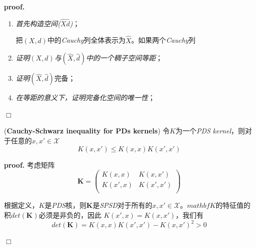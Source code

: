 \textbf{proof.}\hspace{0.5em}
\begin{enumerate}
    \item \textsl{首先构造空间($\hat{X}$$\hat{d}$)}；
    
    把$(X,d)$中的\textsl{Cauchy}列全体表示为$\hat{X}$。如果两个\textsl{Cauchy}列

    \item \textsl{证明$(X,d)$与$(\hat{X},\hat{d})$中的一个稠子空间等距}；
    \item \textsl{证明$(\hat{X},\hat{d})$}完备；
    \item \textsl{在等距的意义下，证明完备化空间的唯一性}；
\end{enumerate}
$\Box$

\begin{mdframed}
  \begin{lemma}
    (\textbf{Cauchy-Schwarz inequality for PDs kernels})\hspace{0.5em} 令$K$为一个\textsl{PDS kernel}，则对于任意的$x,x'\in \mathcal{X}$
    \begin{equation}
        K(x,x')\leqslant K(x,x)K(x',x')
    \end{equation}
  \end{lemma}  
\end{mdframed}

\textbf{proof.}\hspace*{0.5em} 考虑矩阵
\begin{equation}
    \mathbf{K}=\left(
        \begin{array}{cc}
            K(x,x) & K(x,x') \\
            K(x',x) & K(x',x') \\ 
        \end{array}
    \right)
\end{equation}

根据定义，$K$是\textsl{PDS}核，则$\mathbf{K}$是\textsl{SPSD}对于所有的$x,x'\in \mathcal{X}$。$mathbf{K}$的特征值的积$det(\mathbf{K})$必须是非负的，因此
$K(x',x)=K(x,x')$，我们有
\begin{equation}
    det(\mathbf{K})=K(x,x)K(x',x')-K(x,x')^2>0
\end{equation}

$\Box$

